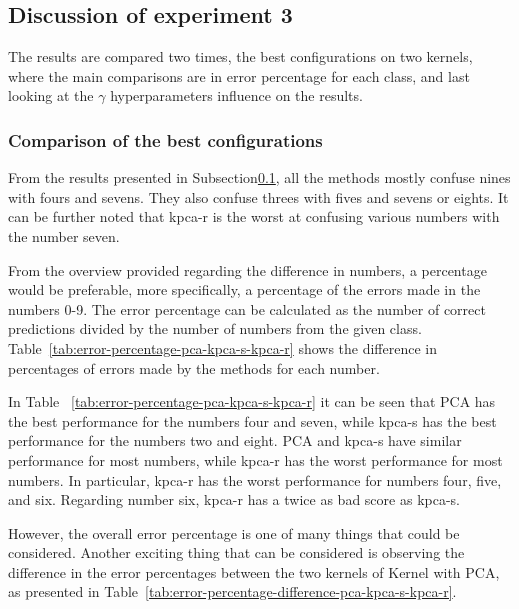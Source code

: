 \subsection{Discussion of experiment 3}\label{subsec:discussion-experiment-3}
The results are compared two times, the best configurations on two kernels, where the main comparisons are in error percentage for each class, and last looking at the $\gamma$ hyperparameters influence on the results.

\subsubsection{Comparison of the best configurations}
From the results presented in Subsection\ref{subsec:discussion-experiment-3}, all the methods mostly confuse nines with fours and sevens. They also confuse threes with fives and sevens or eights. It can be further noted that \gls{kpca-r} is the worst at confusing various numbers with the number seven.



From the overview provided regarding the difference in numbers, a percentage would be preferable, more specifically, a percentage of the errors made in the numbers 0-9. The error percentage can be calculated as the number of correct predictions divided by the number of numbers from the given class. Table~\ref{tab:error-percentage-pca-kpca-s-kpca-r} shows the difference in percentages of errors made by the methods for each number.

In Table ~\ref{tab:error-percentage-pca-kpca-s-kpca-r} it can be seen that PCA has the best performance for the numbers four and seven, while \gls{kpca-s} has the best performance for the numbers two and eight. PCA and \gls{kpca-s} have similar performance for most numbers, while \gls{kpca-r} has the worst performance for most numbers. In particular, \gls{kpca-r} has the worst performance for numbers four, five, and six. Regarding number six, \gls{kpca-r} has a twice as bad score as \gls{kpca-s}. 

However, the overall error percentage is one of many things that could be considered. Another exciting thing that can be considered is observing the difference in the error percentages between the two kernels of Kernel with PCA, as presented in Table~\ref{tab:error-percentage-difference-pca-kpca-s-kpca-r}.



